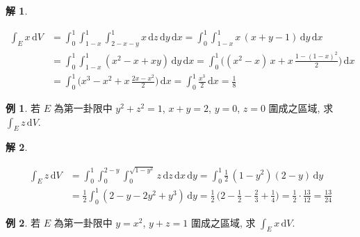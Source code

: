 \documentclass[12pt]{extarticle}
\newcommand{\ds}{\displaystyle}
\theoremstyle{definition}
\newtheorem*{ex}{例}
\newtheorem*{sol}{解}
\begin{document}
\begin{sol}
  \begin{minipage}{0.2\textwidth}
    \includegraphics[scale=0.99,page=42]{fig/prob.pdf}
  \end{minipage}
  \begin{minipage}{0.8\textwidth}
    \begin{align*}
      \int_E x\,\text{d}V &= \int_0^1\!\!\int_{1 - x}^1\int_{2 - x - y}^{1}x\,\text{d}z\,\text{d}y\,\text{d}x = \int_0^1\!\!\int_{1 - x}^1 x\,(x + y - 1)\,\text{d}y\,\text{d}x \\ 
      &= \int_0^1\!\!\int_{1 - x}^1 (x^2 - x + xy)\,\text{d}y\,\text{d}x = \int_0^1 \Big((x^2 - x)\,x + x\,\frac{1 - (1 - x)^2}{2}\Big)\,\text{d}x \\
    &= \int_0^1 \Big(x^3 - x^2 + x\,\frac{2x - x^2}{2}\Big)\,\text{d}x = \int_0^1 \frac{x^3}{2}\,\text{d}x = \frac{1}{8}
    \end{align*}
  \end{minipage}
\end{sol}

\begin{ex}
  若 $E$ 為第一卦限中 $y^2 + z^2 = 1$, $x + y = 2$, $y = 0$, $z = 0$ 圍成之區域, 求 $\ds\int_E z\,\text{d}V$.
\end{ex}

\begin{sol}
  \begin{minipage}{0.15\textwidth}
    \includegraphics[scale=0.8,page=39]{fig/prob.pdf}
  \end{minipage}
  \begin{minipage}{0.85\textwidth}
    \begin{align*}
      \int_E z\,\text{d}V &= \int_0^1\!\!\int_0^{2 - y}\!\!\!\int_{0}^{\sqrt{1 - y^2}}\!\!\!z\,\text{d}z\,\text{d}x\,\text{d}y = \int_0^1\frac{1}{2}\,(1 - y^2)(2 - y)\,\text{d}y \\ &= \frac{1}{2}\int_0^1(2 - y - 2y^2 + y^3)\,\text{d}y = \frac{1}{2}\,\Big(2 - \frac{1}{2} - \frac{2}{3} + \frac{1}{4}\Big) = \frac{1}{2}\cdot\frac{13}{12} = \frac{13}{24}
    \end{align*}
  \end{minipage}
\end{sol}

\begin{ex}
  若 $E$ 為第一卦限中 $y = x^2$, $y + z = 1$ 圍成之區域, 求 $\ds\int_E x\,\text{d}V$.
\end{ex}
\end{document}
